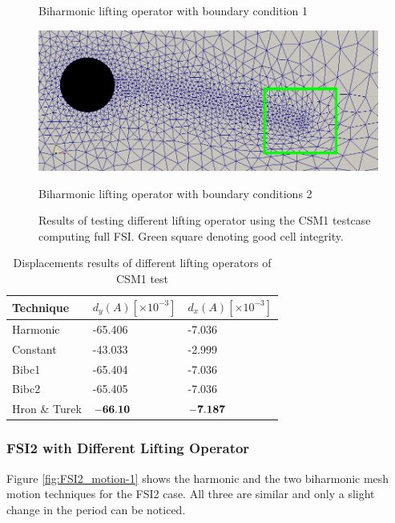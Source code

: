 \begin{figure}[H]
\begin{minipage}[b]{0.6\linewidth}
    \caption{Biharmonic lifting operator with boundary condition 1} 
    \vspace{4ex}
  \end{minipage}%
  \begin{minipage}[b]{0.6\linewidth}
    \centering
    \includegraphics[scale=0.25]{./Mesh_motion_results/CSM1_bibc2_rectangle.png} 
    \caption{Biharmonic lifting operator with boundary conditions 2} 
    \vspace{4ex}
  \end{minipage} 
  \caption{Results of testing different lifting operator using the CSM1 testcase computing full FSI. Green square denoting good cell integrity.}
  \label{fig:CSM1_pictures} 
\end{figure}

\begin{table}[H]
\centering
\caption{Displacements results of different lifting operators of CSM1 test}
\label{tab:comparing lifting}
\begin{tabular}{|l|l|l|}
\hline
Technique & $d_y(A) [\times 10^{-3}]$ & $d_x(A) [\times 10^{-3}]$ \\ \hline
Harmonic & -65.406 & -7.036 \\ \hline
Constant & -43.033 & -2.999 \\ \hline
Bibc1 & -65.404 & -7.036 \\ \hline
Bibc2 & -65.405 & -7.036 \\ \hline
Hron \& Turek & $\bold{-66.10}$& $\bold{-7.187}$\\ \hline
\end{tabular}
\end{table}

\subsubsection{FSI2 with Different Lifting Operator}

Figure \ref{fig:FSI2_motion-1} shows the harmonic and the two biharmonic mesh motion techniques for the FSI2 case. All three are similar and only a slight change in the period can be noticed.
 
